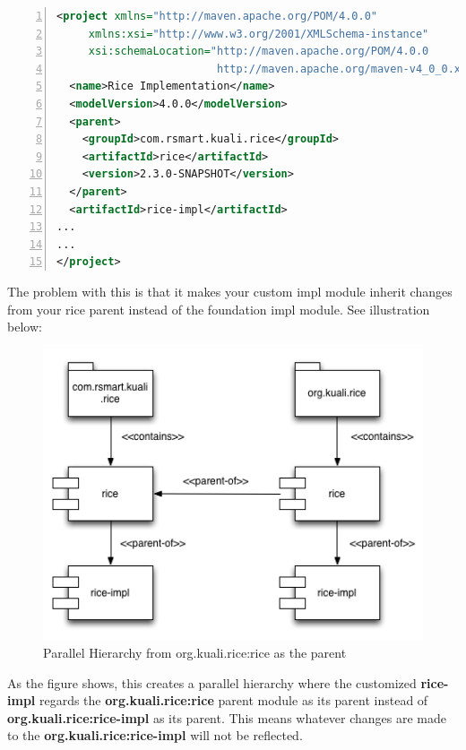 \documentclass[12pt,notitlepage]{article}
\begin{document}
\begin{lstlisting}[numbers=left,language=xml,basicstyle=\scriptsize,backgroundcolor=\color{ubergray},caption={Custom Impl Module Parent Definition},frame=single,breaklines=true]
<project xmlns="http://maven.apache.org/POM/4.0.0" 
     xmlns:xsi="http://www.w3.org/2001/XMLSchema-instance" 
     xsi:schemaLocation="http://maven.apache.org/POM/4.0.0 
                         http://maven.apache.org/maven-v4_0_0.xsd">
  <name>Rice Implementation</name>
  <modelVersion>4.0.0</modelVersion>
  <parent>
    <groupId>com.rsmart.kuali.rice</groupId>
    <artifactId>rice</artifactId>
    <version>2.3.0-SNAPSHOT</version>
  </parent>
  <artifactId>rice-impl</artifactId>
...
...
</project>
  \end{lstlisting}

The problem with this is that it makes your custom impl module inherit changes from your rice parent instead of the foundation impl module. See illustration below: \newpage

\begin{figure}[!hbp]
  \includegraphics[width=\textwidth]{diagrams/RiceMaven1.png}
  \caption{Parallel Hierarchy from org.kuali.rice:rice as the parent}
\end{figure}

As the figure shows, this creates a parallel hierarchy where the customized \textbf{rice-impl} regards the \textbf{org.kuali.rice:rice} parent module as its parent instead of \textbf{org.kuali.rice:rice-impl} as its parent. This means whatever changes are made to the \textbf{org.kuali.rice:rice-impl} will not be reflected. 
\end{document}
